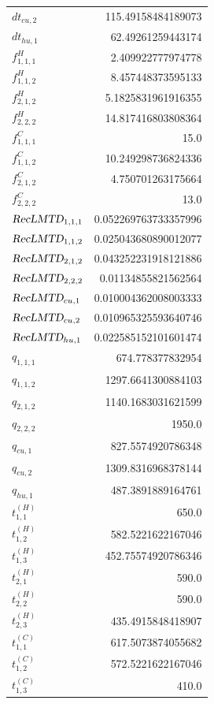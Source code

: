 \documentclass{article}%
\begin{document}
\begin{multicols*}{3}
\begin{supertabular}{lr}
	$dt_{cu,2}$ & 115.49158484189073 \\%
	$dt_{hu,1}$ & 62.49261259443174 \\%
	$f_{1,1,1}^{H}$ & 2.409922777974778 \\%
	$f_{1,1,2}^{H}$ & 8.457448373595133 \\%
	$f_{2,1,2}^{H}$ & 5.1825831961916355 \\%
	$f_{2,2,2}^{H}$ & 14.817416803808364 \\%
	$f_{1,1,1}^{C}$ & 15.0 \\%
	$f_{1,1,2}^{C}$ & 10.249298736824336 \\%
	$f_{2,1,2}^{C}$ & 4.750701263175664 \\%
	$f_{2,2,2}^{C}$ & 13.0 \\%
	$\textsl{RecLMTD}_{1,1,1}$ & 0.052269763733357996 \\%
	$\textsl{RecLMTD}_{1,1,2}$ & 0.025043680890012077 \\%
	$\textsl{RecLMTD}_{2,1,2}$ & 0.043252231918121886 \\%
	$\textsl{RecLMTD}_{2,2,2}$ & 0.01134855821562564 \\%
	$\textsl{RecLMTD}_{cu,1}$ & 0.010004362008003333 \\%
	$\textsl{RecLMTD}_{cu,2}$ & 0.010965325593640746 \\%
	$\textsl{RecLMTD}_{hu,1}$ & 0.022585152101601474 \\%
	$q_{1,1,1}$ & 674.778377832954 \\%
	$q_{1,1,2}$ & 1297.6641300884103 \\%
	$q_{2,1,2}$ & 1140.1683031621599 \\%
	$q_{2,2,2}$ & 1950.0 \\%
	$q_{cu,1}$ & 827.5574920786348 \\%
	$q_{cu,2}$ & 1309.8316968378144 \\%
	$q_{hu,1}$ & 487.3891889164761 \\%
	$t_{1,1}^{(H)}$ & 650.0 \\%
	$t_{1,2}^{(H)}$ & 582.5221622167046 \\%
	$t_{1,3}^{(H)}$ & 452.75574920786346 \\%
	$t_{2,1}^{(H)}$ & 590.0 \\%
	$t_{2,2}^{(H)}$ & 590.0 \\%
	$t_{2,3}^{(H)}$ & 435.4915848418907 \\%
	$t_{1,1}^{(C)}$ & 617.5073874055682 \\%
	$t_{1,2}^{(C)}$ & 572.5221622167046 \\%
	$t_{1,3}^{(C)}$ & 410.0 \\%

\end{supertabular}
\end{multicols*}
\end{document}

